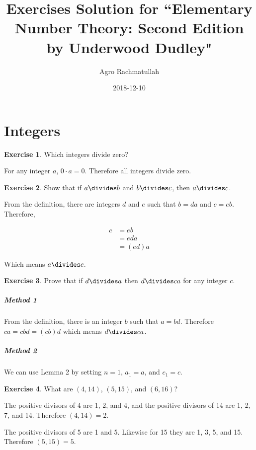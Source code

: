 \documentclass{article}
\title{Exercises Solution for ``Elementary Number Theory: Second Edition by Underwood Dudley"}
\date{2018-12-10}
\author{Agro Rachmatullah}
\theoremstyle{definition}
\newtheorem{exercise}{Exercise}[section]
\begin{document}
  \maketitle
  
  \newpage
  \section{Integers}
  
  \begin{exercise}
    Which integers divide zero?
  \end{exercise}
  
  For any integer $a$, $0 \cdot a = 0$. Therefore all integers divide zero.
  
  \begin{exercise}
    Show that if $a \divides b$ and $b \divides c$, then $a \divides c$.
  \end{exercise}
  
  From the definition, there are integers $d$ and $e$ such that $b = da$ and $c = eb$.
  Therefore,
  
  \begin{align*}
  c &= eb \\
     &= eda \\
     &= (ed)a
  \end{align*}
  
  Which means $a \divides c$.
  
  \begin{exercise}
    Prove that if $d \divides a$ then $d \divides ca$ for any integer $c$.
  \end{exercise}
  
  \subparagraph{Method 1} From the definition, there is an integer $b$ such that $a = bd$. Therefore $ca = cbd = (cb)d$
  which means $d \divides ca$.
  
  \subparagraph{Method 2} We can use Lemma 2 by setting $n = 1$, $a_1 = a$, and $c_1 = c$.
  
  \begin{exercise}
    What are $(4, 14)$, $(5, 15)$, and $(6, 16)$?
  \end{exercise}
  
  The positive divisors of 4 are 1, 2, and 4, and the positive divisors of 14 are 1, 2, 7, and 14. Therefore $(4, 14) = 2$.
  
  The positive divisors of 5 are 1 and 5. Likewise for 15 they are 1, 3, 5, and 15. Therefore $(5, 15) = 5$.
  
\end{document}
